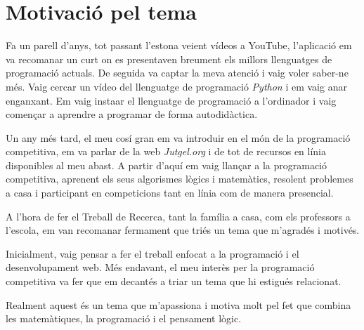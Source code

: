 \section{Motivació pel tema}

Fa un parell d'anys, tot passant l'estona veient vídeos a YouTube, l'aplicació em va recomanar un curt on es presentaven breument els millors llenguatges de programació actuals. De seguida va captar la meva atenció i vaig voler saber-ne més. Vaig cercar un vídeo del llenguatge de programació \emph{Python} i em vaig anar enganxant. Em vaig insta\lgem ar el llenguatge de programació a l'ordinador i vaig començar a aprendre a programar de forma autodidàctica. \newline

Un any més tard, el meu cosí gran em va introduir en el món de la programació competitiva, em va parlar de la web \emph{Jutgel.org} i de tot de recursos en línia disponibles al meu abast. A partir d'aquí em vaig llançar a la programació competitiva, aprenent els seus algorismes lògics i matemàtics, resolent problemes a casa i participant en competicions tant en línia com de manera presencial. \newline

A l'hora de fer el Treball de Recerca, tant la família a casa, com els professors a l'escola, em van recomanar fermament que triés un tema que m'agradés i motivés. \newline

Inicialment, vaig pensar a fer el treball enfocat a la programació i el desenvolupament web. Més endavant, el meu interès per la programació competitiva va fer que em decantés a triar un tema que hi estigués relacionat. \newline

Realment aquest és un tema que m'apassiona i motiva molt pel fet que combina les matemàtiques, la programació i el pensament lògic.  






